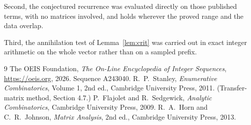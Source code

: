 \documentclass[11pt,a4paper]{article}
\theoremstyle{plain}
\theoremstyle{definition}
\begin{document}
Second, the conjectured recurrence was evaluated directly on those published terms, with no
matrices involved, and holds wherever the proved range and the data overlap.

Third, the annihilation test of Lemma~\ref{lem:crit} was carried out in exact integer
arithmetic on the whole vector rather than on a sampled prefix.

\begin{thebibliography}{9}
 The OEIS Foundation, \emph{The On-Line Encyclopedia of Integer
Sequences}, \url{https://oeis.org}, 2026. Sequence A243040.
 R.~P.~Stanley, \emph{Enumerative Combinatorics}, Volume 1, 2nd ed.,
Cambridge University Press, 2011. (Transfer-matrix method, Section 4.7.)
 P.~Flajolet and R.~Sedgewick, \emph{Analytic Combinatorics}, Cambridge
University Press, 2009.
 R.~A.~Horn and C.~R.~Johnson, \emph{Matrix Analysis}, 2nd ed., Cambridge
University Press, 2013.
\end{thebibliography}
\end{document}
